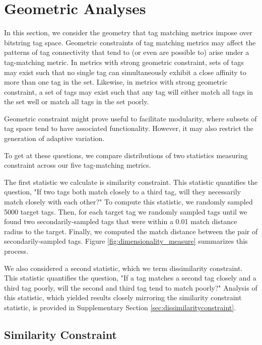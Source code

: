 \section{Geometric Analyses} \label{sec:geometric}

In this section, we consider the geometry that tag matching metrics impose over bitstring tag space.
Geometric constraints of tag matching metrics may affect the patterns of tag connectivity that tend to (or even are possible to) arise under a tag-matching metric.
In metrics with strong geometric constraint, sets of tags may exist such that no single tag can simultaneously exhibit a close affinity to more than one tag in the set.
Likewise, in metrics with strong geometric constraint, a set of tags may exist such that any tag will either match all tags in the set well or match all tags in the set poorly.

Geometric constraint might prove useful to facilitate modularity, where subsets of tag space tend to have associated functionality.
However, it may also restrict the generation of adaptive variation.

To get at these questions, we compare distributions of two statistics measuring constraint across our five tag-matching metrics.
% 

The first statistic we calculate is similarity constraint.
This statistic quantifies the question, "If two tags both match closely to a third tag, will they necessarily match closely with each other?"
To compute this statistic, we randomly sampled 5000 target tags.
Then, for each target tag we randomly sampled tags until we found two secondarily-sampled tags that were within a 0.01 match distance radius to the target.
Finally, we computed the match distance between the pair of secondarily-sampled tags.
Figure \ref{fig:dimensionality_measure} summarizes this process.

We also considered a second statistic, which we term dissimilarity constraint.
This statistic quantifies the question, "If a tag matches a second tag closely and a third tag poorly, will the second and third tag tend to match poorly?"
Analysis of this statistic, which yielded results closely mirroring the similarity constraint statistic, is provided in Supplementary Section \ref{sec:dissimilarityconstraint}.

\subsection{Similarity Constraint}

